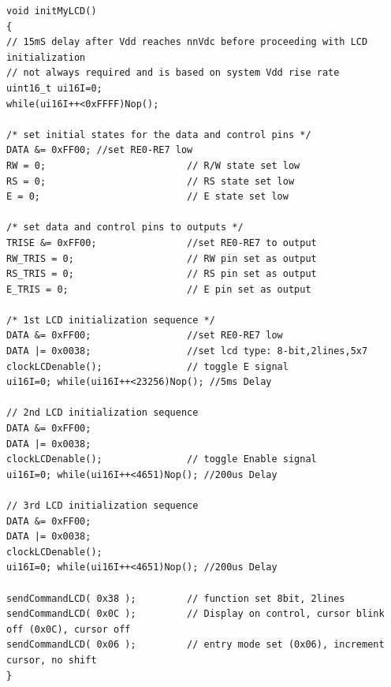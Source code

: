 \begin{lstlisting}[frame=htrbl, caption={Initalisierungssequenz des LCD-Controllers}, label={lst:lcdinit}]
void initMyLCD()
{
// 15mS delay after Vdd reaches nnVdc before proceeding with LCD initialization
// not always required and is based on system Vdd rise rate
uint16_t ui16I=0;
while(ui16I++<0xFFFF)Nop();

/* set initial states for the data and control pins */
DATA &= 0xFF00; //set RE0-RE7 low
RW = 0;                         // R/W state set low
RS = 0;                         // RS state set low
E = 0;                          // E state set low

/* set data and control pins to outputs */
TRISE &= 0xFF00;                //set RE0-RE7 to output
RW_TRIS = 0;                    // RW pin set as output
RS_TRIS = 0;                    // RS pin set as output
E_TRIS = 0;                     // E pin set as output

/* 1st LCD initialization sequence */
DATA &= 0xFF00;                 //set RE0-RE7 low
DATA |= 0x0038;                 //set lcd type: 8-bit,2lines,5x7
clockLCDenable();               // toggle E signal
ui16I=0; while(ui16I++<23256)Nop(); //5ms Delay

// 2nd LCD initialization sequence
DATA &= 0xFF00;
DATA |= 0x0038;
clockLCDenable(); 				// toggle Enable signal
ui16I=0; while(ui16I++<4651)Nop(); //200us Delay

// 3rd LCD initialization sequence
DATA &= 0xFF00;
DATA |= 0x0038;
clockLCDenable();
ui16I=0; while(ui16I++<4651)Nop(); //200us Delay

sendCommandLCD( 0x38 );         // function set 8bit, 2lines
sendCommandLCD( 0x0C );         // Display on control, cursor blink off (0x0C), cursor off
sendCommandLCD( 0x06 );         // entry mode set (0x06), increment cursor, no shift 
}
\end{lstlisting}
\newpage

